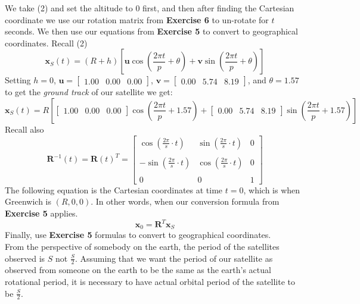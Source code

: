 \documentclass[11pt]{article}
\theoremstyle{definition}
\newcommand{\1}[1]{\mathbf{1} \left \{ #1 \right \}}
\begin{document}
We take (2) and set the altitude to $0$ first, and then after finding the Cartesian coordinate we use our rotation matrix from \textbf{Exercise 6} to un-rotate for $t$ seconds.  We then use our equations from \textbf{Exercise 5} to convert to geographical coordinates.  Recall (2)
\[\textbf{x}_S (t) = (R+h) \left[\textbf{u}\cos \left(\frac{2\pi t}{p} + \theta \right) + \textbf{v}\sin \left(\frac{2\pi t}{p} + \theta \right)\right]\]
Setting $h=0$, \(\textbf{u} = \begin{bmatrix} 1.00 & 0.00 & 0.00 \end{bmatrix}\), \(\textbf{v} = \begin{bmatrix} 0.00 & 5.74 & 8.19 \end{bmatrix}\), and $\theta = 1.57$ to get the \textit{ground track} of our satellite we get:
\[\textbf{x}_S (t) = R \left[\begin{bmatrix} 1.00 & 0.00 & 0.00 \end{bmatrix}\cos \left(\frac{2\pi t}{p} + 1.57\right) + \begin{bmatrix} 0.00 & 5.74 & 8.19 \end{bmatrix}\sin \left(\frac{2\pi t}{p} + 1.57\right)\right]\]
Recall also
\[\textbf{R}^{-1}(t) = \textbf{R}(t)^T = \begin{bmatrix}
\cos \left(\frac{2\pi}{s} \cdot t\right) & \sin \left(\frac{2\pi}{s} \cdot t\right) & 0 \\ \\
-\sin \left(\frac{2\pi}{s} \cdot t\right) & \cos \left(\frac{2\pi}{s} \cdot t\right) & 0 \\ \\
0 & 0 & 1 \end{bmatrix}\]
The following equation is the Cartesian coordinates at time $t=0$, which is when Greenwich is $(R,0,0)$.  In other words, when our conversion formula from \textbf{Exercise 5} applies.
\[\textbf{x}_0 = \textbf{R}^T \textbf{x}_S\]
Finally, use \textbf{Exercise 5} formulas to convert to geographical coordinates. \\
From the perspective of somebody on the earth, the period of the satellites observed is $S$ not $\frac{S}{2}$.  Assuming that we want the period of our satellite as observed from someone on the earth to be the same as the earth's actual rotational period, it is necessary to have actual orbital period of the satellite to be $\frac{S}{2}$.
\end{document}
